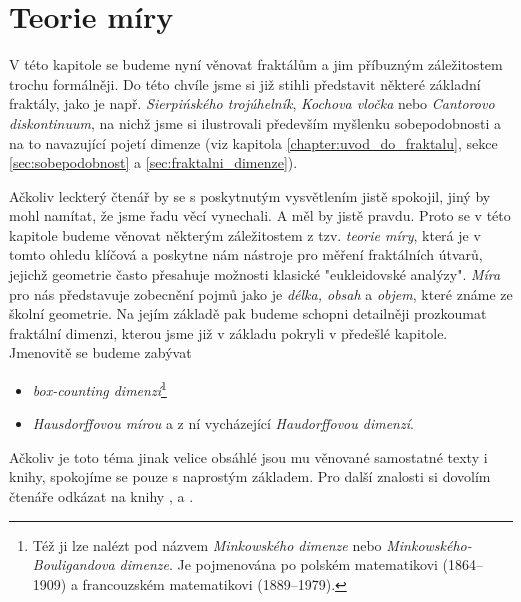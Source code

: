 \chapter{Teorie míry}\label{chapter:teorie-miry}

V této kapitole se budeme nyní věnovat fraktálům a jim příbuzným záležitostem trochu formálněji. Do této chvíle jsme si již stihli představit některé základní fraktály, jako je např. \emph{Sierpińského trojúhelník}, \emph{Kochova vločka} nebo \emph{Cantorovo diskontinuum}, na nichž jsme si ilustrovali především myšlenku sobepodobnosti a na to navazující pojetí dimenze (viz kapitola \ref{chapter:uvod_do_fraktalu}, sekce \ref{sec:sobepodobnost} a \ref{sec:fraktalni_dimenze}).

Ačkoliv leckterý čtenář by se s poskytnutým vysvětlením jistě spokojil, jiný by mohl namítat, že jsme řadu věcí vynechali. A měl by jistě pravdu. Proto se v této kapitole budeme věnovat některým záležitostem z tzv. \emph{teorie míry}, která je v tomto ohledu klíčová a poskytne nám nástroje pro měření fraktálních útvarů, jejichž geometrie často přesahuje možnosti klasické "eukleidovské analýzy". \emph{Míra} pro nás představuje zobecnění pojmů jako je \emph{délka, obsah} a \emph{objem}, které známe ze školní geometrie. Na jejím základě pak budeme schopni detailněji prozkoumat fraktální dimenzi, kterou jsme již v základu pokryli v předešlé kapitole. Jmenovitě se budeme zabývat
\begin{itemize}
    \item \emph{box-counting dimenzí}\footnote{Též ji lze nalézt pod názvem \emph{Minkowského dimenze} nebo \emph{Minkowského-Bouligandova dimenze}.  Je pojmenována po polském matematikovi  (1864--1909) a francouzském matematikovi  (1889--1979).} 
    \item \emph{Hausdorffovou mírou} a z ní vycházející \emph{Haudorffovou dimenzí}.
\end{itemize}

Ačkoliv je toto téma jinak velice obsáhlé jsou mu věnované samostatné texty i knihy, spokojíme se pouze s naprostým základem. Pro další znalosti si dovolím čtenáře odkázat na knihy \cite{Falconer2014}, \cite{Lukes2013} a \cite{Netuka2016}.



